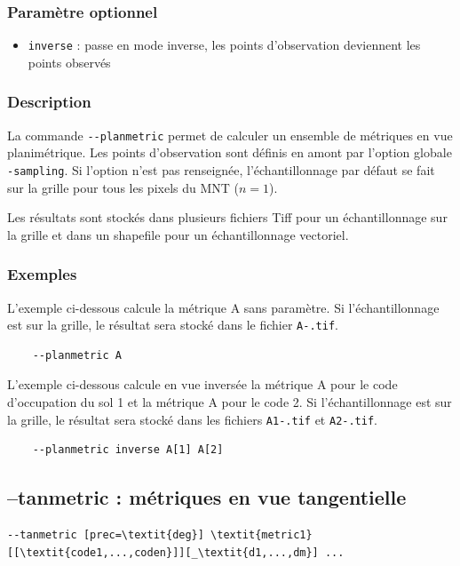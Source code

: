 \documentclass{report}
\begin{document}
\subsubsection{Paramètre optionnel}
\begin{itemize}
	\item \verb|inverse| : passe en mode inverse, les points d'observation deviennent les points observés
\end{itemize}

\subsubsection{Description}
La commande \verb|--planmetric| permet de calculer un ensemble de métriques en vue planimétrique. Les points d'observation sont définis en amont par l'option globale \verb|-sampling|. Si l'option n'est pas renseignée, l'échantillonnage par défaut se fait sur la grille pour tous les pixels du MNT ($n=1$).

Les résultats sont stockés dans plusieurs fichiers Tiff pour un échantillonnage sur la grille et dans un shapefile pour un échantillonnage vectoriel.


\subsubsection{Exemples}

L'exemple ci-dessous calcule la métrique A sans paramètre. Si l'échantillonnage est sur la grille, le résultat sera stocké dans le fichier \verb|A-.tif|.
\begin{Verbatim}
	--planmetric A
\end{Verbatim}

L'exemple ci-dessous calcule en vue inversée la métrique A pour le code d'occupation du sol 1 et la métrique A pour le code 2. Si l'échantillonnage est sur la grille, le résultat sera stocké dans les fichiers \verb|A1-.tif| et \verb|A2-.tif|.
\begin{Verbatim}
	--planmetric inverse A[1] A[2]
\end{Verbatim}


\subsection{--tanmetric : métriques en vue tangentielle}
\begin{Verbatim}[commandchars=\\\{\}]
--tanmetric [prec=\textit{deg}] \textit{metric1}[[\textit{code1,...,coden}]][_\textit{d1,...,dm}] ...
\end{Verbatim}
\end{document}
